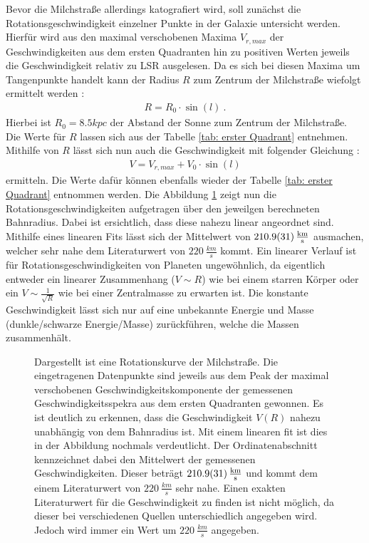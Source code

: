 Bevor die Milchstraße allerdings katografiert wird, soll zunächst die Rotationsgeschwindigkeit einzelner Punkte in der Galaxie untersicht werden. Hierfür wird aus den maximal verschobenen Maxima $V_{r,max}$ der Geschwindigkeiten aus dem ersten Quadranten hin zu positiven Werten jeweils die Geschwindigkeit relativ zu LSR ausgelesen. Da es sich bei diesen Maxima um Tangenpunkte handelt kann der Radius $R$ zum Zentrum der Milchstraße wiefolgt ermittelt werden \cite{H1}:
\begin{align}
    R = R_0 \cdot \sin(l) \ .
    \label{eq:TangenteR}
\end{align}
Hierbei ist $R_0 = \si{8.5}{kpc}$ der Abstand der Sonne zum Zentrum der Milchstraße. Die Werte für $R$ lassen sich aus der Tabelle \ref{tab: erster Quadrant} entnehmen. Mithilfe von $R$ lässt sich nun auch die Geschwindigkeit mit folgender Gleichung \cite{H1}:
\begin{align}
    V = V_{r,max} + V_0 \cdot \sin(l)
    \label{eq:V(R)}
\end{align}
ermitteln. Die Werte dafür können ebenfalls wieder der Tabelle \ref{tab: erster Quadrant} entnommen werden. Die Abbildung \ref{fig:VvonR} zeigt nun die Rotationsgeschwindigkeiten aufgetragen über den jeweilgen berechneten Bahnradius. Dabei ist ersichtlich, dass diese nahezu linear angeordnet sind. Mithilfe eines linearen Fits lässt sich der Mittelwert von $\SI{210.9 \pm 3.1}{\frac{km}{s}}$ ausmachen, welcher sehr nahe dem Literaturwert von $\SI{220}{\frac{km}{s}}$ \cite{LSR} kommt. Ein linearer Verlauf ist für Rotationsgeschwindigkeiten von Planeten ungewöhnlich, da eigentlich entweder ein linearer Zusammenhang ($V \sim R$) wie bei einem starren Körper oder ein $V \sim\frac{1}{\sqrt{R}}$ wie bei einer Zentralmasse zu erwarten ist. Die konstante Geschwindigkeit lässt sich nur auf eine unbekannte Energie und Masse (dunkle/schwarze  Energie/Masse) zurückführen, welche die Massen zusammenhält.
\begin{figure}[H]
    \centering
    
    \caption[Rotationskurve der Milchstraße]{Dargestellt ist eine Rotationskurve der Milchstraße. Die eingetragenen Datenpunkte sind jeweils aus dem Peak der maximal verschobenen Geschwindigkeitskomponente der gemessenen Geschwindigkeitsspekra aus dem ersten Quadranten gewonnen. Es ist deutlich zu erkennen, dass die Geschwindigkeit $V(R)$ nahezu unabhängig von dem Bahnradius ist. Mit einem linearen fit ist dies in der Abbildung nochmals verdeutlicht. Der Ordinatenabschnitt kennzeichnet dabei den Mittelwert der gemessenen Geschwindigkeiten. Dieser beträgt $\SI{210.9 \pm 3.1}{\frac{km}{s}}$ und kommt dem einem Literaturwert von $\SI{220}{\frac{km}{s}}$ \cite{LSR} sehr nahe. Einen exakten Literaturwert für die Geschwindigkeit zu finden ist nicht möglich, da dieser bei verschiedenen Quellen unterschiedlich angegeben wird. Jedoch wird immer ein Wert um $\SI{220}{\frac{km}{s}}$ angegeben.}
    \label{fig:VvonR}
\end{figure}
